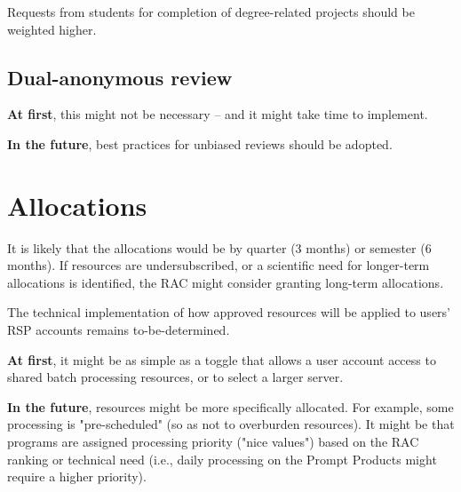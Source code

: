 Requests from students for completion of degree-related projects should be weighted higher.


\subsection{Dual-anonymous review}\label{ssec:proposals-anonymized}

\textbf{At first}, this might not be necessary -- and it might take time to implement.

\textbf{In the future}, best practices for unbiased reviews should be adopted.


\section{Allocations}\label{sec:allocations}

It is likely that the allocations would be by quarter (3 months) or semester (6 months).
If resources are undersubscribed, or a scientific need for longer-term allocations is identified, the RAC might consider granting long-term allocations.

The technical implementation of how approved resources will be applied to users' RSP accounts remains to-be-determined.

\textbf{At first}, it might be as simple as a toggle that allows a user account access to shared batch processing resources, or to select a larger server.

\textbf{In the future}, resources might be more specifically allocated.
For example, some processing is "pre-scheduled" (so as not to overburden resources).
It might be that programs are assigned processing priority ("nice values") based on the RAC ranking or technical need
(i.e., daily processing on the Prompt Products might require a higher priority). 



